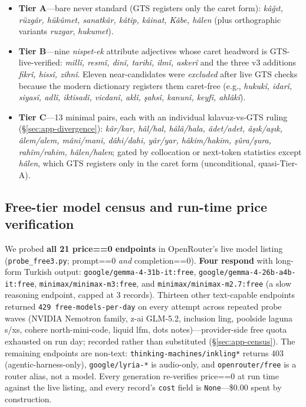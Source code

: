 \documentclass[11pt]{article}
\begin{document}
\begin{itemize}
\item \textbf{Tier A}---bare never standard (GTS registers only the caret form): \emph{k{\^a}{\u{g}}{\i}t, r{\"u}zg{\^a}r, h{\"u}k{\^u}met, sanatk{\^a}r, k{\^a}tip, k{\^a}inat, K{\^a}be, h{\^a}len} (plus orthographic variants \emph{ruzgar}, \emph{hukumet}).
\item \textbf{Tier B}---nine \emph{nispet-ek} attribute adjectives whose caret headword is GTS-live-verified: \emph{mill{\^i}, resm{\^i}, din{\^i}, tarih{\^i}, ilm{\^i}, asker{\^i}} and the three v3 additions \emph{fikr{\^i}, hiss{\^i}, zihn{\^i}}. Eleven near-candidates were \emph{excluded} after live GTS checks because the modern dictionary registers them caret-free (e.g., \emph{hukuk{\^i}, idar{\^i}, siyas{\^i}, adl{\^i}, iktisad{\^i}, vicdan{\^i}, akl{\^i}, {\c s}ahs{\^i}, kanun{\^i}, keyf{\^i}, ahl{\^a}k{\^i}}).
\item \textbf{Tier C}---13 minimal pairs, each with an individual k{\i}lavuz-vs-GTS ruling (\S\ref{sec:app-divergence}): \emph{k{\^a}r/kar, h{\^a}l/hal, h{\^a}l{\^a}/hala, {\^a}det/adet, {\^a}{\c s}{\i}k/a{\c s}{\i}k, {\^a}lem/alem, m{\^a}ni/mani, d{\^a}hi/dahi, y{\^a}r/yar, h{\^a}kim/hakim, {\c s}{\^u}ra/{\c s}ura, rah{\^i}m/rahim, h{\^a}len/halen}; gated by collocation or next-token statistics except \emph{h{\^a}len}, which GTS registers only in the caret form (unconditional, quasi-Tier-A).
\end{itemize}

\subsection{Free-tier model census and run-time price verification}

We probed \textbf{all 21 price==0 endpoints} in OpenRouter's live model listing \cite{openrouter2026} (\texttt{probe\_free3.py}; prompt==0 \emph{and} completion==0). \textbf{Four respond} with long-form Turkish output: \texttt{google/gemma-4-31b-it:free}, \texttt{google/gemma-4-26b-a4b-it:free}, \texttt{minimax/minimax-m3:free}, and \texttt{minimax/minimax-m2.7:free} (a slow reasoning endpoint, capped at 3 records). Thirteen other text-capable endpoints returned \texttt{429 free-models-per-day} on every attempt across repeated probe waves (NVIDIA Nemotron family, z-ai GLM-5.2, inclusion ling, poolside laguna s/xs, cohere north-mini-code, liquid lfm, dots notes)---provider-side free quota exhausted on run day; recorded rather than substituted (\S\ref{sec:app-census}). The remaining endpoints are non-text: \texttt{thinking-machines/inkling*} returns 403 (agentic-harness-only), \texttt{google/lyria-*} is audio-only, and \texttt{openrouter/free} is a router alias, not a model. Every generation re-verifies price==0 at run time against the live listing, and every record's \texttt{cost} field is \texttt{None}---\$0.00 spent by construction.
\end{document}
